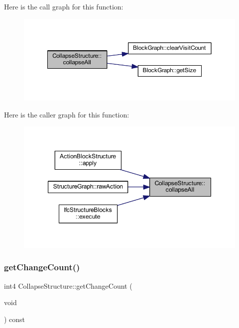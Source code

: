 Here is the call graph for this function\+:
\nopagebreak
\begin{figure}[H]
\begin{center}
\leavevmode
\includegraphics[width=350pt]{class_collapse_structure_a5e36c78c71bf1ded2090424af870b7a0_cgraph}
\end{center}
\end{figure}
Here is the caller graph for this function\+:
\nopagebreak
\begin{figure}[H]
\begin{center}
\leavevmode
\includegraphics[width=347pt]{class_collapse_structure_a5e36c78c71bf1ded2090424af870b7a0_icgraph}
\end{center}
\end{figure}
\mbox{\label{class_collapse_structure_a075bcd360eb6a82c92689fc18f1fcc1e}} 
\subsubsection{\texorpdfstring{getChangeCount()}{getChangeCount()}}
{\footnotesize\ttfamily int4 Collapse\+Structure\+::get\+Change\+Count (\begin{DoxyParamCaption}\item[{void}]{ }\end{DoxyParamCaption}) const\hspace{0.3cm}{\ttfamily [inline]}}



